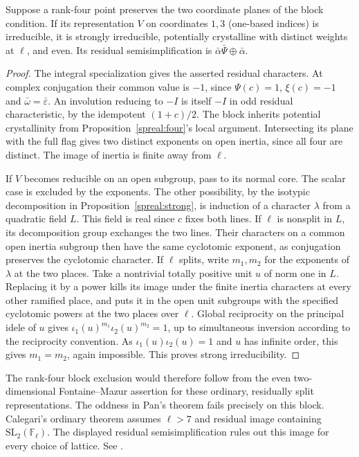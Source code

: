 \begin{lemma}\label{spreal:even}
Suppose a rank-four point preserves the two coordinate planes of
the block condition. If its representation \(V\) on coordinates
\(1,3\) (one-based indices) is irreducible, it is strongly
irreducible, potentially crystalline with distinct weights at
\(\ell\), and even. Its residual semisimplification is
\(\bar\alpha\bar\Psi\oplus\bar\alpha\).
\end{lemma}
\begin{proof}
The integral specialization gives the asserted residual characters.
At complex conjugation their common value is \(-1\), since
\(\Psi(c)=1\), \(\xi(c)=-1\) and \(\bar\omega=\bar\varepsilon\).
An involution reducing to \(-I\) is itself \(-I\) in odd residual
characteristic, by the idempotent \((1+c)/2\). The block inherits
potential crystallinity from Proposition~\ref{spreal:four}'s
local argument. Intersecting its plane with the full flag gives
two distinct exponents on open inertia, since all four are distinct.
The image of inertia is finite away from \(\ell\).

If \(V\) becomes reducible on an open subgroup, pass to its normal core.
The scalar case is excluded by the exponents. The other possibility,
by the isotypic decomposition in Proposition~\ref{spreal:strong},
is induction of a character \(\lambda\) from a quadratic field \(L\).
This field is real since \(c\) fixes both lines. If \(\ell\) is
nonsplit in \(L\), its decomposition group exchanges the two lines.
Their characters on a common open inertia subgroup then have the
same cyclotomic exponent, as conjugation preserves the cyclotomic
character. If \(\ell\) splits, write \(m_1,m_2\) for the exponents
of \(\lambda\) at the two places. Take a nontrivial totally positive
unit \(u\) of norm one in \(L\). Replacing it by a power kills its
image under the finite inertia characters at every other ramified
place, and puts it in the open unit subgroups with the specified
cyclotomic powers at the two places over \(\ell\). Global reciprocity
on the principal idele of \(u\) gives
\(\iota_1(u)^{m_1}\iota_2(u)^{m_2}=1\), up to simultaneous
inversion according to the reciprocity convention. As
\(\iota_1(u)\iota_2(u)=1\) and \(u\) has infinite order, this gives
\(m_1=m_2\), again impossible. This proves strong irreducibility.
\end{proof}

The rank-four block exclusion would therefore follow from the even
two-dimensional Fontaine--Mazur assertion for these ordinary, residually
split representations. The oddness in Pan's theorem fails precisely
on this block. Calegari's ordinary theorem assumes
\(\ell>7\) and residual image containing \(\mathrm{SL}_2(\mathbb F_\ell)\).
The displayed residual semisimplification rules out this image for
every choice of lattice. See \cite[Theorem 1.2]{calegariEven}.


